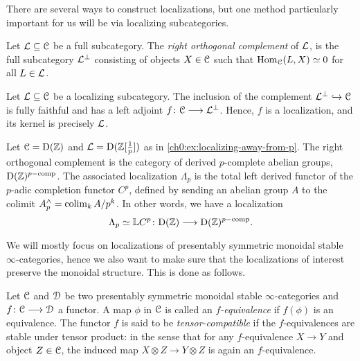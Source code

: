 There are several ways to construct localizations, but one method particularly important for us will be via localizing subcategories. 

\begin{definition}
    \label{ch0:def:right-orthogonal-complement}
    Let $\mathcal{L}\subseteq \EuScript{C}$ be a full subcategory. The \emph{right orthogonal complement} of $\mathcal{L}$, is the full subcategory $\mathcal{L}^\perp$ consisting of objects $X\in \EuScript{C}$ such that $\operatorname{Hom}_{\EuScript{C}}(L,X)\simeq 0$ for all $L\in \mathcal{L}$.  
\end{definition}

\begin{example}
    \label{ch0:ex:localization-from-localizing-subcategory}
    Let $\mathcal{L}\subseteq \EuScript{C}$ be a localizing subcategory. The inclusion of the complement $\mathcal{L}^\perp \hookrightarrow \EuScript{C}$ is fully faithful and has a left adjoint $f\colon \EuScript{C}\longrightarrow \mathcal{L}^\perp$. Hence, $f$ is a localization, and its kernel is precisely $\mathcal{L}$. 
\end{example}

\begin{example}
    \label{ch0:ex:derived-p-completion}
    Let $\EuScript{C}=\mathrm{D}(\mathbb{Z})$ and $\mathcal{L} = \mathrm{D}(\mathbb{Z}[\frac{1}{p}])$ as in \cref{ch0:ex:localizing-away-from-p}. The right orthogonal complement is the category of derived $p$-complete abelian groups, $\mathrm{D}(\mathbb{Z})^{p-\mathrm{comp}}$. The associated localization $\Lambda_p$ is the total left derived functor of the $p$-adic completion functor $C^p$, defined by sending an abelian group $A$ to the colimit $A^\wedge_p = \operatorname{colim}_k A/p^k$. In other words, we have a localization 
    \[\Lambda_p \simeq \mathbb{L} C^p \colon \mathrm{D}(\mathbb{Z})\longrightarrow \mathrm{D}(\mathbb{Z})^{p-\mathrm{comp}}.\]
\end{example}

We will mostly focus on localizations of presentably symmetric monoidal stable $\infty$-categories, hence we also want to make sure that the localizations of interest preserve the monoidal structure. This is done as follows. 

\begin{definition}
    \label{ch0:def:L-equivalence}
    Let $\EuScript{C}$ and $\EuScript{D}$ be two presentably symmetric monoidal stable $\infty$-categories and $f\colon \EuScript{C}\longrightarrow \EuScript{D}$ a functor. A map $\phi$ in $\EuScript{C}$ is called an \emph{$f$-equivalence} if $f(\phi)$ is an equivalence. The functor $f$ is said to be \emph{tensor-compatible} if the $f$-equivalences are stable under tensor product: in the sense that for any $f$-equivalence $X\longrightarrow Y$ and object $Z\in \EuScript{C}$, the induced map $X\otimes Z\longrightarrow Y\otimes Z$ is again an $f$-equivalence. 
\end{definition}


